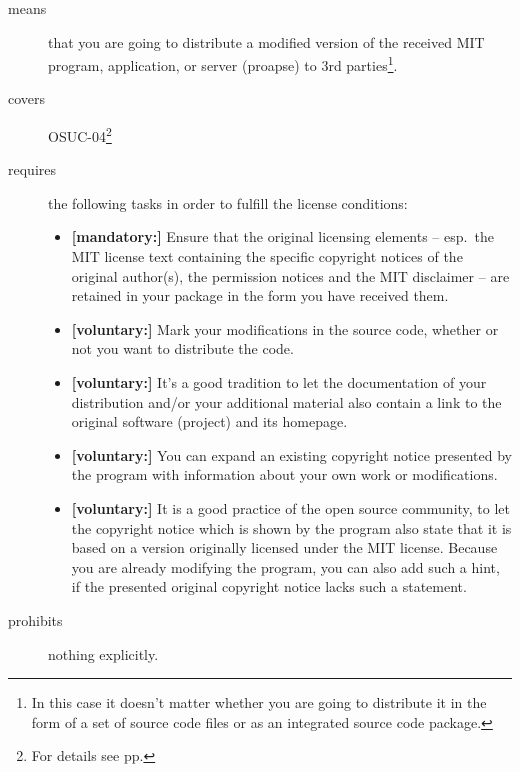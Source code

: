 \begin{description}
\item[means] that you are going to distribute a modified version of the received
MIT program, application, or server (proapse) to 3rd parties\footnote{In this
case it doesn't matter whether you are going to distribute it in the form of a set
of source code files or as an integrated source code package.}.
\item[covers] OSUC-04\footnote{For details see pp. \pageref{OSUC-04-DEF}}
\item[requires] the following tasks in order to fulfill the license conditions:
\begin{itemize}
  \item \textbf{[mandatory:]} Ensure that the original licensing elements -- esp.\
  the MIT license text containing the specific copyright notices of the original
  author(s), the permission notices and the MIT disclaimer -- are retained in
  your package in the form you have received them.
  \item \textbf{[voluntary:]} Mark your modifications in the source code,
  whether or not you want to distribute the code.
  \item \textbf{[voluntary:]} It's a good tradition to let the documentation of
  your distribution and/or your additional material also contain a link to the
  original software (project) and its homepage.
  \item \textbf{[voluntary:]} You can expand an existing copyright notice
  presented by the program with information about your own work or
  modifications.
  \item \textbf{[voluntary:]} It is a good practice of the open source
  community, to let the copyright notice which is shown by the program also
  state that it is based on a version originally licensed under the MIT license.
  Because you are already modifying the program, you can also add such a hint,
  if the presented original copyright notice lacks such a statement.
\end{itemize}
\item[prohibits] nothing explicitly.
\end{description}

